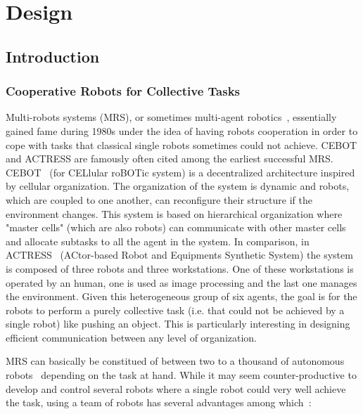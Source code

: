 \chapter{Design}
\label{chapter:design}


\minitoc[n] %

\section{Introduction}

  \subsection{Cooperative Robots for Collective Tasks}

    Multi-robots systems (MRS), or sometimes multi-agent robotics~\cite{Dudek1996}, essentially gained fame during 1980s under the idea of having robots cooperation in order to cope with tasks that classical single robots sometimes could not achieve. CEBOT and ACTRESS are famously often cited among the earliest successful MRS. CEBOT~\cite{Fukuda1988} (for CELlular roBOTic system) is a decentralized architecture inspired by cellular organization. The organization of the system is dynamic and robots, which are coupled to one another, can reconfigure their structure if the environment changes. This system is based on hierarchical organization where "master cells" (which are also robots) can communicate with other master cells and allocate subtasks to all the agent in the system. In comparison, in ACTRESS~\cite{Asama1989} (ACtor-based Robot and Equipments Synthetic System) the system is composed of three robots and three workstations. One of these workstations is operated by an human, one is used as image processing and the last one manages the environment. Given this heterogeneous group of six agents, the goal is for the robots to perform a purely collective task (i.e. that could not be achieved by a single robot) like pushing an object. This is particularly interesting in designing efficient communication between any level of organization.

    MRS can basically be constitued of between two to a thousand of autonomous robots~\cite{Rubenstein2014} depending on the task at hand. While it may seem counter-productive to develop and control several robots where a single robot could very well achieve the task, using a team of robots has several advantages among which~\cite{Cao1997, Arkin1998}:

